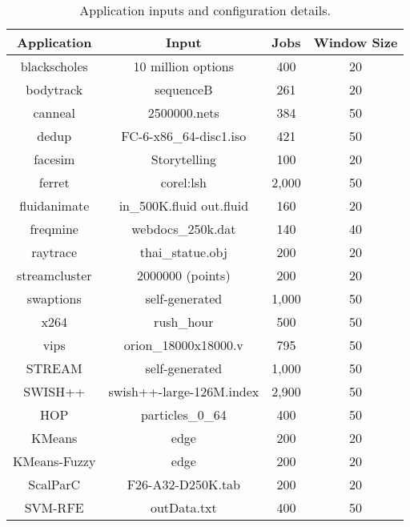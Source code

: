 \begin{table}[t]
\small
\centering
\caption{Application inputs and configuration details.}
\begin{tabular}{cccc}
  \textbf{Application} & \textbf{Input} & \textbf{Jobs} & \textbf{Window Size} \\
  \hline
  \hline
  blackscholes    & 10 million options             & 400      & 20 \\
  bodytrack       & sequenceB                      & 261      & 20 \\
  canneal         & 2500000.nets                   & 384      & 50 \\
  dedup           & FC-6-x86\_64-disc1.iso         & 421      & 50 \\
  facesim         & Storytelling                   & 100      & 20 \\
  ferret          & corel:lsh                      & 2,000    & 50 \\
  fluidanimate    & in\_500K.fluid out.fluid       & 160      & 20 \\
  freqmine        & webdocs\_250k.dat              & 140      & 40 \\
  raytrace        & thai\_statue.obj               & 200      & 20 \\
  streamcluster   & 2000000 (points)               & 200      & 20 \\
  swaptions       & self-generated                 & 1,000    & 50 \\
  x264            & rush\_hour                     & 500      & 50 \\
  vips            & orion\_18000x18000.v           & 795      & 50 \\
  STREAM          & self-generated                 & 1,000    & 50 \\
  SWISH++         & swish++-large-126M.index       & 2,900    & 50 \\
  HOP             & particles\_0\_64               & 400      & 50 \\
  KMeans          & edge                           & 200      & 20 \\
  KMeans-Fuzzy    & edge                           & 200      & 20 \\
  ScalParC        & F26-A32-D250K.tab              & 200      & 20 \\
  SVM-RFE         & outData.txt                    & 400      & 50 \\
  \hline
  \hline
\end{tabular}
\label{tbl:inputs}
\end{table}

